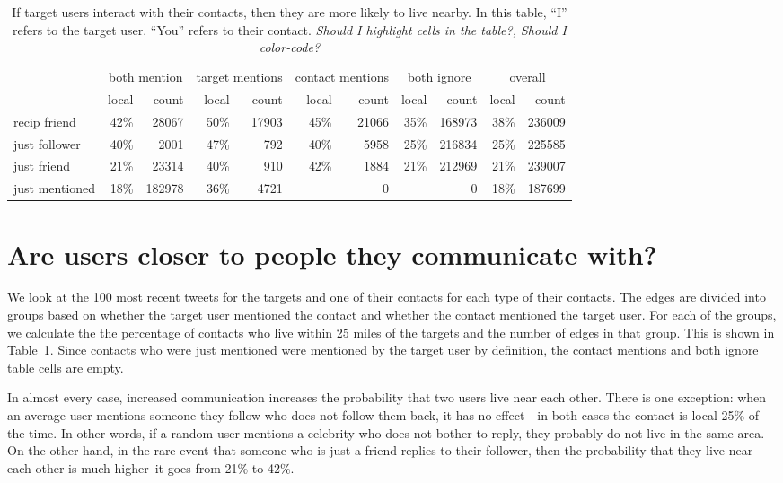 \begin{table}[tbh]
\scriptsize
\centering
\begin{tabular}{l | r r | r r | r r | r r | r r}
    & \multicolumn{2}{c}{both mention}
    & \multicolumn{2}{|c}{target mentions}
    & \multicolumn{2}{|c}{contact mentions}
    & \multicolumn{2}{|c}{both ignore}
    & \multicolumn{2}{|c}{overall} \\
    \cline{2-11}
    &local&count&local&count&local&count&local&count&local&count \\
    \hline
    recip friend & 42\%&28067 & 50\%&17903 & 45\%&21066 & 35\%&168973 & 38\%&236009 \\
    just follower & 40\%&2001 & 47\%&792 & 40\%&5958 & 25\%&216834 & 25\%&225585 \\
    just friend & 21\%&23314 & 40\%&910 & 42\%&1884 & 21\%&212969 & 21\%&239007 \\
    just mentioned & 18\%&182978 & 36\%&4721 & & 0 & & 0 & 18\%&187699 \\
\end{tabular}
\caption{
If target users interact with their contacts, then they are more likely to
live nearby.
%
In this table, ``I'' refers to the target user. ``You'' refers to their
contact.
%
\emph{Should I highlight cells in the table?, Should I color-code?}
}
\label{tab:ComTypes}
\end{table}

\section{Are users closer to people they communicate with?}

We look at the 100 most recent tweets for the targets and one of their
contacts for each type of their contacts.
%
The edges are divided into groups based on whether the target user
mentioned the contact and whether the contact mentioned the target user.
%
For each of the groups, we calculate the the percentage of contacts who
live within 25 miles of the targets and the number of edges in that group.
%
This is shown in Table~\ref{tab:ComTypes}.
%
Since contacts who were just mentioned were mentioned by the target
user by definition, the contact mentions and both ignore table cells are
empty.

In almost every case, increased communication increases the probability that
two users live near each other.
%
There is one exception: when an average user mentions someone they follow who
does not follow them back, it has no effect---in both cases the contact is
local 25\% of the time.
%
In other words, if a random user mentions a celebrity who does not bother to
reply, they probably do not live in the same area.
%
On the other hand, in the rare event that someone who is just a friend replies
to their follower, then the probability that they live near each other is much
higher--it goes from 21\% to 42\%.


